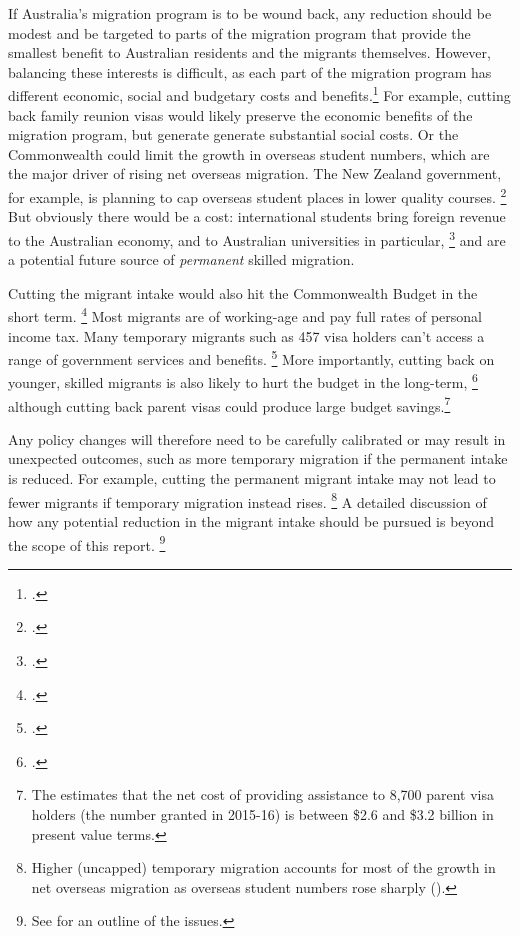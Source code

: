 If Australia's migration program is to be wound back, any reduction should be modest and be targeted to parts of the migration program that provide the smallest benefit to Australian residents and the migrants themselves.
However, balancing these interests is difficult, as each part of the migration program has different economic, social and budgetary costs and benefits.\footcite{Rizvi_2018_immigration_debate_inside_story}
For example, cutting back family reunion visas would likely preserve the economic benefits of the migration program, but generate generate substantial social costs.
Or the Commonwealth could limit the growth in overseas student numbers, which are the major driver of rising net overseas migration.
The New Zealand government, for example, is planning to cap overseas student places in lower quality courses.%
    \footcite{NZ_Labour_2018_immigration}
But obviously there would be a cost: international students bring foreign revenue to the Australian economy, and to Australian universities in particular,%
    \footcite{Norton2015cashnexushow}
 and are a potential future source of \textit{permanent} skilled migration.

Cutting the migrant intake would also hit the Commonwealth Budget in the short term.%
    \footcite{ABC-2018-Two-senior-ministers-slap-down-Abbott-immigration}    
Most migrants are of working-age and pay full rates of personal income tax. Many temporary migrants such as 457 visa holders can’t access a range of government services and benefits.%
    \footcite{Sherrell20184_57changes}
More importantly, cutting back on younger, skilled migrants is also likely to hurt the budget in the long-term,%
    \footcite[][Figure~9.3]{CommissionMigrantIntake2016}
although cutting back parent visas could produce large budget savings.\footnote{The \textcite[][27]{CommissionMigrantIntake2016} estimates that the net cost of providing assistance to 8,700 parent visa holders (the number granted in 2015-16) is between \$2.6 and \$3.2 billion in present value terms.}

Any policy changes will therefore need to be carefully calibrated or may result in unexpected outcomes, such as more temporary migration if the permanent intake is reduced. For example, cutting the permanent migrant intake may not lead to fewer migrants if temporary migration instead rises.%
    \footnote{Higher (uncapped) temporary migration accounts for most of the growth in net overseas migration as overseas student numbers rose sharply (\textcite{ABC-2018-Two-senior-ministers-slap-down-Abbott-immigration}).}
A detailed discussion of how any potential reduction in the migrant intake should be pursued is beyond the scope of this report.%
    \footnote{See \textcite{Rizvi_2018_immigration_debate_inside_story} for an outline of the issues.}
